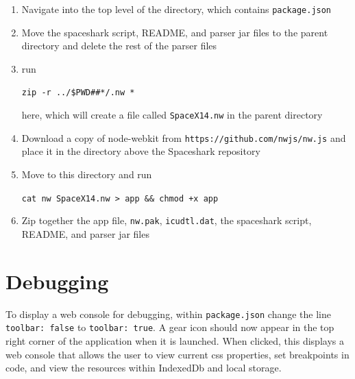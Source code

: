 \documentclass{hmcclinic}
\begin{document}
\begin{enumerate}
  \item Navigate into the top level of the directory, which contains
    \texttt{package.json}
  \item Move the spaceshark script, README, and parser jar files to the parent directory
    and delete the rest of the parser files
  \item run
    \begin{center}\texttt{zip -r ../\${PWD\#\#*/}.nw *}\end{center} here, which will create a file
    called \texttt{SpaceX14.nw} in the parent directory
  \item Download a copy of node-webkit from
    \texttt{https://github.com/nwjs/nw.js} and
    place it in the directory above the Spaceshark repository
  \item Move to this directory and run 
    \begin{center}\texttt{cat nw SpaceX14.nw >
      app \&\& chmod +x app}\end{center}
  \item Zip together the app file, \texttt{nw.pak}, \texttt{icudtl.dat}, the spaceshark script,
    README, and parser jar files
\end{enumerate}

\newpage
\section{Debugging}
To display a web console for debugging, within \texttt{package.json} change the line
\texttt{toolbar: false} to \texttt{toolbar: true}. A gear icon should now appear in the
top right corner of the application when it is launched. When clicked, this
displays a web console that allows the user to view current css properties,
set breakpoints in code, and view the resources within IndexedDb and local
storage.
\end{document}
